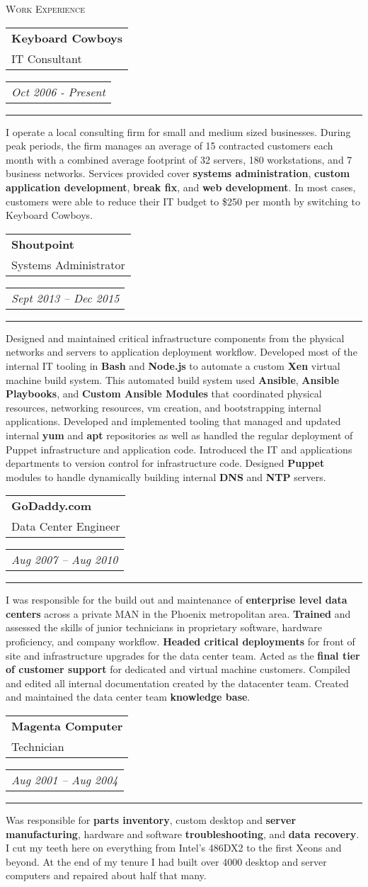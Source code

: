 \documentclass{article}
\makeatletter
\newcommand{\split}[3]{
\noindent\begin{tabular}[t]{@{}l}
    \textbf{#1} \\ #2
\end{tabular}
\hfill
\begin{tabular}[t]{l@{}}
    \\
    \textit{#3}
\end{tabular}
\noindent\rule{\columnwidth}{0.5pt}
}
\newcommand{\sub}[1]{
    {\raggedleft
        \large{\textsc{\color{OliveGreen}#1}}\par
    }
}
\makeatother
\begin{document}
\begin{multicols}{2}

\sub{Work Experience}

\split{Keyboard Cowboys}{IT Consultant}{Oct 2006 - Present}
I operate a local consulting firm for small and medium sized businesses. During peak periods, the firm manages an average of 15 contracted customers each month with a combined average footprint of 32 servers, 180 workstations, and 7 business networks. Services provided cover \textbf{systems administration}, \textbf{custom application development}, \textbf{break fix}, and \textbf{web development}. In most cases, customers were able to reduce their IT budget to \$250 per month by switching to Keyboard Cowboys.

\split{Shoutpoint}{Systems Administrator}{Sept 2013 -- Dec 2015}
Designed and maintained critical infrastructure components from the physical networks and servers to application deployment workflow. Developed most of the internal IT tooling in \textbf{Bash} and \textbf{Node.js} to automate a custom \textbf{Xen} virtual machine build system. This automated build system used \textbf{Ansible}, \textbf{Ansible Playbooks}, and \textbf{Custom Ansible Modules} that coordinated physical resources, networking resources, vm creation, and bootstrapping internal applications. Developed and implemented tooling that managed and updated internal \textbf{yum} and \textbf{apt} repositories as well as handled the regular deployment of Puppet infrastructure and application code. Introduced the IT and applications departments to version control for infrastructure code. Designed \textbf{Puppet} modules to handle dynamically building internal \textbf{DNS} and \textbf{NTP} servers.

\split{GoDaddy.com}{Data Center Engineer}{Aug 2007 -- Aug 2010}
I was responsible for the build out and maintenance of \textbf{enterprise level data centers} across a private MAN in the Phoenix metropolitan area. \textbf{Trained} and assessed the skills of junior technicians in proprietary software, hardware proficiency, and company workflow. \textbf{Headed critical deployments} for front of site and infrastructure upgrades for the data center team. Acted as the \textbf{final tier of customer support} for dedicated and virtual machine customers. Compiled and edited all internal documentation created by the datacenter team. Created and maintained the data center team \textbf{knowledge base}.

\split{Magenta Computer}{Technician}{Aug 2001 -- Aug 2004}
Was responsible for \textbf{parts inventory}, custom desktop and \textbf{server manufacturing}, hardware and software \textbf{troubleshooting}, and \textbf{data recovery}. I cut my teeth here on everything from Intel's 486DX2 to the first Xeons and beyond. At the end of my tenure I had built over 4000 desktop and server computers and repaired about half that many.


\end{multicols}
\end{document}
